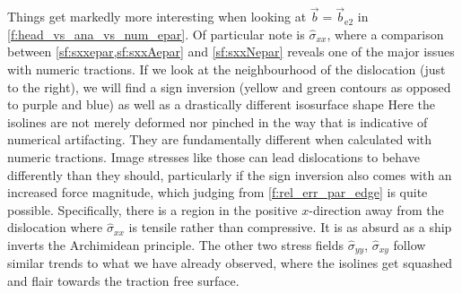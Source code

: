 \documentclass[11pt]{iopart}
\begin{document}
Things get markedly more interesting when looking at $\vec{b} = \vec{b}_{\textrm{e2}}$ in \cref{f:head_vs_ana_vs_num_epar}. Of particular note is $\hat{\sigma}_{xx}$, where a comparison between \cref{sf:sxxepar,sf:sxxAepar} and \cref{sf:sxxNepar} reveals one of the major issues with numeric tractions. If we look at the neighbourhood of the dislocation (just to the right), we will find a sign inversion (yellow and green contours as opposed to purple and blue) as well as a drastically different isosurface shape Here the isolines are not merely deformed nor pinched in the way that is indicative of numerical artifacting. They are fundamentally different when calculated with numeric tractions. Image stresses like those can lead dislocations to behave differently than they should, particularly if the sign inversion also comes with an increased force magnitude, which judging from \cref{f:rel_err_par_edge} is quite possible. Specifically, there is a region in the positive $x$-direction away from the dislocation where $\hat{\sigma}_{xx}$ is tensile rather than compressive. It is as absurd as a ship inverts the Archimidean principle. The other two stress fields $\hat{\sigma}_{yy}$, $\hat{\sigma}_{xy}$ follow similar trends to what we have already observed, where the isolines get squashed and flair towards the traction free surface.
\end{document}
